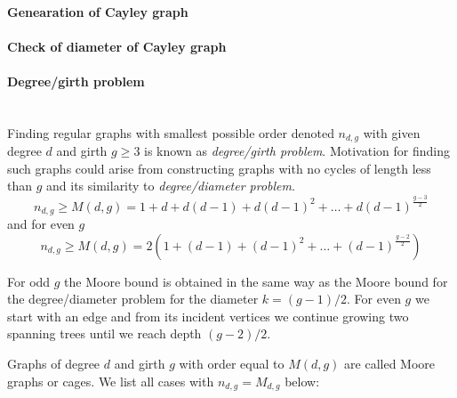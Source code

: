 \documentclass[portrait,a0,final]{a0poster}
\begin{document}
\begin{multicols}{3}
\paragraph{Genearation of Cayley graph}


\paragraph{Check of diameter of Cayley graph}



\paragraph{Degree/girth problem}
~\\
Finding regular graphs with smallest possible order denoted $n_{d,g}$ with given degree $d$ and girth $g\geq3$ is known as {\em degree/girth problem}. Motivation for finding such graphs could arise from constructing graphs with no cycles of length less than $g$ and its similarity to {\em degree/diameter problem}.
\begin{equation*}
	n_{d,g} \geq M(d,g) = 1 + d + d(d - 1) + d(d - 1)^{2} + \dots + d(d - 1)^{\frac{g-3}{2}}
\end{equation*}
and for even $g$
\begin{equation*}
	n_{d,g} \geq M(d,g) = 2(1 + (d - 1) + (d - 1)^{2} + \dots + (d - 1)^{\frac{g-2}{2}})
\end{equation*}

For odd $g$ the Moore bound is obtained in the same way as the Moore bound for the degree/diameter problem for the diameter $k=(g-1)/2$. For even $g$ we start with an edge and from its incident vertices we continue growing two spanning trees until we reach depth $(g-2)/2$.

Graphs of degree $d$ and girth $g$ with order equal to $M(d,g)$ are called Moore graphs or cages. We list all cases with $n_{d,g} = M_{d,g}$ below:


\end{multicols}
\end{document}
